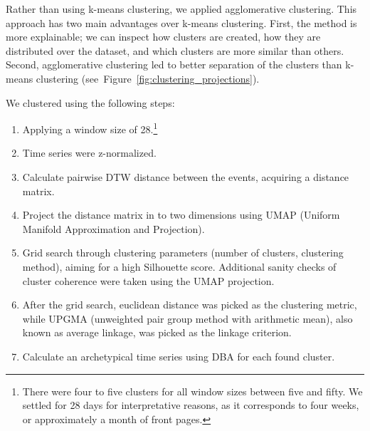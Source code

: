 \documentclass[]{ceurart}
\begin{document}
Rather than using k-means clustering, we applied agglomerative clustering. This approach has two main advantages over k-means clustering. First, the method is more explainable; we can inspect how clusters are created, how they are distributed over the dataset, and which clusters are more similar than others. Second, agglomerative clustering led to better separation of the clusters than k-means clustering (see~Figure~\ref{fig:clustering_projections}).

We clustered using the following steps:
\begin{enumerate}
    \item Applying a window size of 28.\footnote{There were four to five clusters for all window sizes between five and fifty. We settled for 28 days for interpretative reasons, as it corresponds to four weeks, or approximately a month of front pages.}
    \item Time series were z-normalized.
    \item Calculate pairwise DTW distance between the events, acquiring a distance matrix.
    \item Project the distance matrix in to two dimensions using UMAP (Uniform Manifold Approximation and Projection).
    \item Grid search through clustering parameters (number of clusters, clustering method), aiming for a high Silhouette score. Additional sanity checks of cluster coherence were taken using the UMAP projection.
    \item After the grid search, euclidean distance was picked as the clustering metric, while UPGMA (unweighted pair group method with arithmetic mean), also known as average linkage, was picked as the linkage criterion. 
    \item Calculate an archetypical time series using DBA for each found cluster.
\end{enumerate}
\end{document}
